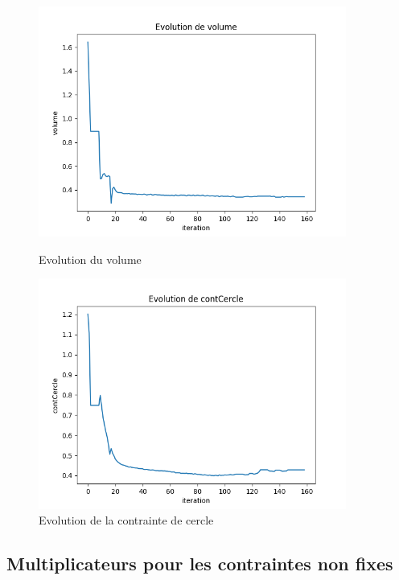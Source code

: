 \documentclass[11pt,a4paper]{article}
\begin{document}
\begin{itemize}
\begin{figure}[H]
	\begin{minipage}{0.48\textwidth}
		\includegraphics[width=0.9\textwidth]{lv10lc1lC5volume.png}
		\caption{Evolution du volume}
	\end{minipage}
	\begin{minipage}{0.48\textwidth}
		\includegraphics[width=0.9\textwidth]{lv10lc1lC5ConCercle.png}
		\caption{Evolution de la contrainte de cercle}
	\end{minipage}
\end{figure}


\end{itemize}
\subsection*{Multiplicateurs pour les contraintes non fixes}
\end{document}
